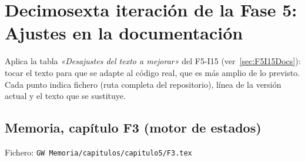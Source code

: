 \section{Decimosexta iteración de la Fase 5: Ajustes en la documentación}
\label{sec:F5I16}

Aplica la tabla \emph{«Desajustes del texto a mejorar»} del F5-I15
(ver~\ref{sec:F5I15Docs}): tocar el texto para que se adapte al código
real, que es más amplio de lo previsto. Cada punto indica fichero
(ruta completa del repositorio), línea de la versión actual y el texto
que se sustituye.


\subsection{Memoria, capítulo F3 (motor de estados)}
\label{sec:F5I16F3}

Fichero: \texttt{GW Memoria/capitulos/capitulo5/F3.tex}

